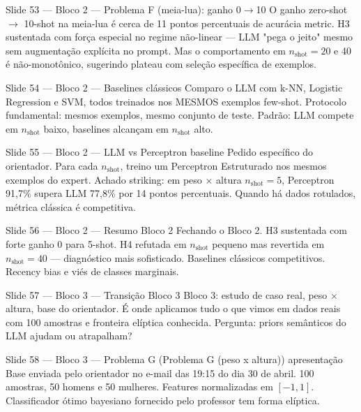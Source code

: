 \documentclass[aspectratio=169,10pt]{beamer}
\begin{document}
\begin{frame}{Slide 53 --- Bloco 2 --- Problema F (meia-lua): ganho 0$\to$10}
\footnotesize
O ganho zero-shot $\to$ 10-shot na meia-lua \'e cerca de 11 pontos percentuais de acur\'acia metric. H3 sustentada com for\c{c}a especial no regime n\~ao-linear --- LLM "pega o jeito" mesmo sem augmenta\c{c}\~ao expl\'icita no prompt. Mas o comportamento em $n_{\text{shot}}=20$ e 40 \'e n\~ao-monot\^onico, sugerindo plateau com sele\c{c}\~ao espec\'ifica de exemplos.
\end{frame}

\begin{frame}{Slide 54 --- Bloco 2 --- Baselines cl\'assicos}
\footnotesize
Comparo o LLM com k-NN, Logistic Regression e SVM, todos treinados nos MESMOS exemplos few-shot. Protocolo fundamental: mesmos exemplos, mesmo conjunto de teste. Padr\~ao: LLM compete em $n_{\text{shot}}$ baixo, baselines alcan\c{c}am em $n_{\text{shot}}$ alto.
\end{frame}

\begin{frame}{Slide 55 --- Bloco 2 --- LLM vs Perceptron baseline}
\footnotesize
Pedido espec\'ifico do orientador. Para cada $n_{\text{shot}}$, treino um Perceptron Estruturado nos mesmos exemplos do expert. Achado striking: em peso $\times$ altura $n_{\text{shot}}=5$, Perceptron 91,7\% supera LLM 77,8\% por 14 pontos percentuais. Quando h\'a dados rotulados, m\'etrica cl\'assica \'e competitiva.
\end{frame}

\begin{frame}{Slide 56 --- Bloco 2 --- Resumo Bloco 2}
\footnotesize
Fechando o Bloco 2. H3 sustentada com forte ganho 0 para 5-shot. H4 refutada em $n_{\text{shot}}$ pequeno mas revertida em $n_{\text{shot}}=40$ --- diagn\'ostico mais sofisticado. Baselines cl\'assicos competitivos. Recency bias e vi\'es de classes marginais.
\end{frame}

\begin{frame}{Slide 57 --- Bloco 3 --- Transi\c{c}\~ao Bloco 3}
\footnotesize
Bloco 3: estudo de caso real, peso $\times$ altura, base do orientador. \'E onde aplicamos tudo o que vimos em dados reais com 100 amostras e fronteira el\'iptica conhecida. Pergunta: priors sem\^anticos do LLM ajudam ou atrapalham?
\end{frame}

\begin{frame}{Slide 58 --- Bloco 3 --- Problema G (Problema G (peso x altura)) apresenta\c{c}\~ao}
\footnotesize
Base enviada pelo orientador no e-mail das 19:15 do dia 30 de abril. 100 amostras, 50 homens e 50 mulheres. Features normalizadas em $[-1, 1]$. Classificador \'otimo bayesiano fornecido pelo professor tem forma el\'iptica.
\end{frame}
\end{document}
